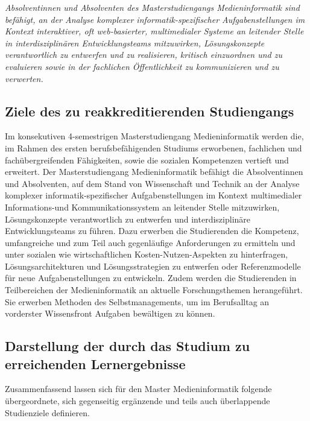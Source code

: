 \emph{Absolventinnen und Absolventen des Masterstudiengangs
Medieninformatik sind befähigt, an der Analyse komplexer
informatik-spezifischer Aufgabenstellungen im Kontext interaktiver, oft
web-basierter, multimedialer Systeme an leitender Stelle in
interdisziplinären Entwicklungsteams mitzuwirken, Lösungskonzepte
verantwortlich zu entwerfen und zu realisieren, kritisch einzuordnen und
zu evaluieren sowie in der fachlichen Öffentlichkeit zu kommunizieren
und zu verwerten.}

\subsection{Ziele des zu reakkreditierenden
Studiengangs}\label{ziele-des-zu-reakkreditierenden-studiengangs-1}

Im konsekutiven 4-semestrigen Masterstudiengang Medieninformatik werden
die, im Rahmen des ersten berufsbefähigenden Studiums erworbenen,
fachlichen und fachübergreifenden Fähigkeiten, sowie die sozialen
Kompetenzen vertieft und erweitert. Der Masterstudiengang
Medieninformatik befähigt die Absolventinnen und Absolventen, auf dem
Stand von Wissenschaft und Technik an der Analyse komplexer
informatik-spezifischer Aufgabenstellungen im Kontext multimedialer
Informations-und Kommunikationssystem an leitender Stelle mitzuwirken,
Lösungskonzepte verantwortlich zu entwerfen und interdisziplinäre
Entwicklungsteams zu führen. Dazu erwerben die Studierenden die
Kompetenz, umfangreiche und zum Teil auch gegenläufige Anforderungen zu
ermitteln und unter sozialen wie wirtschaftlichen Kosten-Nutzen-Aspekten
zu hinterfragen, Lösungsarchitekturen und Lösungsstrategien zu entwerfen
oder Referenzmodelle für neue Aufgabenstellungen zu entwickeln. Zudem
werden die Studierenden in Teilbereichen der Medieninformatik an
aktuelle Forschungsthemen herangeführt. Sie erwerben Methoden des
Selbstmanagements, um im Berufsalltag an vorderster Wissensfront
Aufgaben bewältigen zu können.

\subsection{Darstellung der durch das Studium zu erreichenden
Lernergebnisse}\label{darstellung-der-durch-das-studium-zu-erreichenden-lernergebnisse-1}

Zusammenfassend lassen sich für den Master Medieninformatik folgende
übergeordnete, sich gegenseitig ergänzende und teils auch überlappende
Studienziele definieren.

